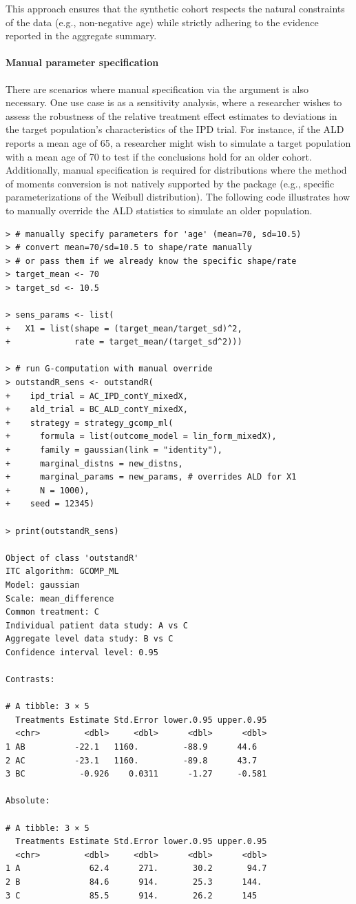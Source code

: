 \documentclass[article]{jss}
\begin{document}
This approach ensures that the synthetic cohort respects the natural constraints of the data (e.g., non-negative age) while strictly adhering to the evidence reported in the aggregate summary.

\paragraph{Manual parameter specification}
There are scenarios where manual specification via the  argument is also necessary. 
One use case is as a sensitivity analysis, where a researcher wishes to assess the robustness of the relative treatment effect estimates to deviations in the target population's characteristics of the IPD trial. For instance, if the ALD reports a mean age of 65, a researcher might wish to simulate a target population with a mean age of 70 to test if the conclusions hold for an older cohort. Additionally, manual specification is required for distributions where the method of moments conversion is not natively supported by the package (e.g., specific parameterizations of the Weibull distribution).
The following code illustrates how to manually override the ALD statistics to simulate an older population.

\begin{verbatim}
> # manually specify parameters for 'age' (mean=70, sd=10.5)
> # convert mean=70/sd=10.5 to shape/rate manually 
> # or pass them if we already know the specific shape/rate
> target_mean <- 70
> target_sd <- 10.5

> sens_params <- list(
+   X1 = list(shape = (target_mean/target_sd)^2, 
+             rate = target_mean/(target_sd^2)))

> # run G-computation with manual override
> outstandR_sens <- outstandR(
+    ipd_trial = AC_IPD_contY_mixedX,
+    ald_trial = BC_ALD_contY_mixedX,
+    strategy = strategy_gcomp_ml(
+      formula = list(outcome_model = lin_form_mixedX),
+      family = gaussian(link = "identity"),
+      marginal_distns = new_distns,
+      marginal_params = new_params, # overrides ALD for X1
+      N = 1000),
+    seed = 12345)

> print(outstandR_sens)

Object of class 'outstandR' 
ITC algorithm: GCOMP_ML 
Model: gaussian 
Scale: mean_difference 
Common treatment: C 
Individual patient data study: A vs C 
Aggregate level data study: B vs C 
Confidence interval level: 0.95 

Contrasts:

# A tibble: 3 × 5
  Treatments Estimate Std.Error lower.0.95 upper.0.95
  <chr>         <dbl>     <dbl>      <dbl>      <dbl>
1 AB          -22.1   1160.         -88.9      44.6  
2 AC          -23.1   1160.         -89.8      43.7  
3 BC           -0.926    0.0311      -1.27     -0.581

Absolute:

# A tibble: 3 × 5
  Treatments Estimate Std.Error lower.0.95 upper.0.95
  <chr>         <dbl>     <dbl>      <dbl>      <dbl>
1 A              62.4      271.       30.2       94.7
2 B              84.6      914.       25.3      144. 
3 C              85.5      914.       26.2      145
\end{verbatim}
\end{document}
